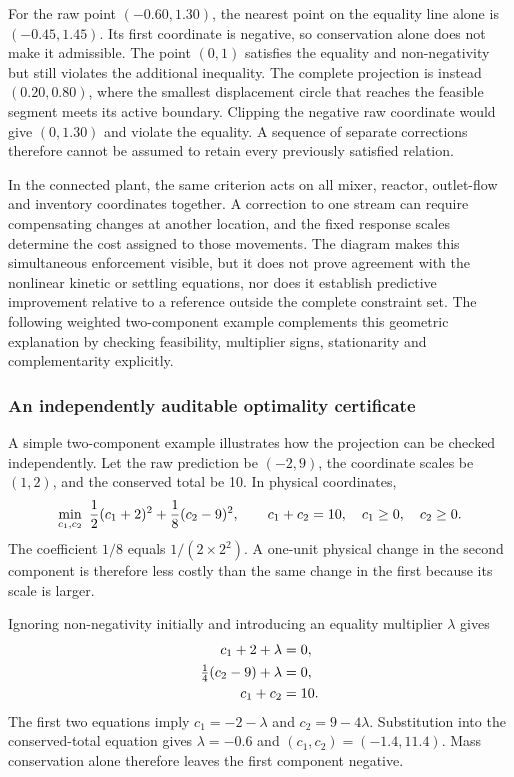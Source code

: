 For the raw point $(-0.60,1.30)$, the nearest point on the equality line alone is $(-0.45,1.45)$. Its first coordinate is negative, so conservation alone does not make it admissible. The point $(0,1)$ satisfies the equality and non-negativity but still violates the additional inequality. The complete projection is instead $(0.20,0.80)$, where the smallest displacement circle that reaches the feasible segment meets its active boundary. Clipping the negative raw coordinate would give $(0,1.30)$ and violate the equality. A sequence of separate corrections therefore cannot be assumed to retain every previously satisfied relation.

In the connected plant, the same criterion acts on all mixer, reactor, outlet-flow and inventory coordinates together. A correction to one stream can require compensating changes at another location, and the fixed response scales determine the cost assigned to those movements. The diagram makes this simultaneous enforcement visible, but it does not prove agreement with the nonlinear kinetic or settling equations, nor does it establish predictive improvement relative to a reference outside the complete constraint set. The following weighted two-component example complements this geometric explanation by checking feasibility, multiplier signs, stationarity and complementarity explicitly.

\subsubsection{An independently auditable optimality certificate}

A simple two-component example illustrates how the projection can be checked independently. Let the raw prediction be $(-2,9)$, the coordinate scales be $(1,2)$, and the conserved total be 10. In physical coordinates,
\begin{equation}
\equationname{Illustrative weighted projection with mass conservation and non-negativity}
\min_{c_1,c_2}\ \frac12(c_1+2)^2+\frac18(c_2-9)^2,
\qquad c_1+c_2=10,\quad c_1\ge0,\quad c_2\ge0.
\end{equation}
The coefficient $1/8$ equals $1/(2\times2^2)$. A one-unit physical change in the second component is therefore less costly than the same change in the first because its scale is larger.

Ignoring non-negativity initially and introducing an equality multiplier $\lambda$ gives
\begin{align}
\equationname{Illustrative projection stationarity for the first component}
c_1+2+\lambda&=0,\\
\equationname{Illustrative projection stationarity for the second component}
\tfrac14(c_2-9)+\lambda&=0,\\
\equationname{Illustrative projection equality for the component total}
c_1+c_2&=10.
\end{align}
The first two equations imply $c_1=-2-\lambda$ and $c_2=9-4\lambda$. Substitution into the conserved-total equation gives $\lambda=-0.6$ and $(c_1,c_2)=(-1.4,11.4)$. Mass conservation alone therefore leaves the first component negative.

